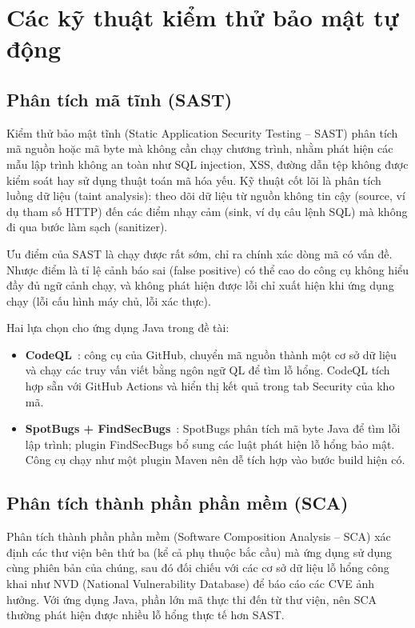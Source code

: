 \documentclass[12pt,a4paper,oneside]{extreport}
\begin{document}
\section{Các kỹ thuật kiểm thử bảo mật tự động}
\label{sec:security-testing}
\subsection{Phân tích mã tĩnh (SAST)}
Kiểm thử bảo mật tĩnh (Static Application Security Testing -- SAST) phân tích mã
nguồn hoặc mã byte mà không cần chạy chương trình, nhằm phát hiện các mẫu lập
trình không an toàn như SQL injection, XSS, đường dẫn tệp không được kiểm soát
hay sử dụng thuật toán mã hóa yếu. Kỹ thuật cốt lõi là phân tích luồng dữ liệu
(taint analysis): theo dõi dữ liệu từ nguồn không tin cậy (source, ví dụ tham số
HTTP) đến các điểm nhạy cảm (sink, ví dụ câu lệnh SQL) mà không đi qua bước làm
sạch (sanitizer).

Ưu điểm của SAST là chạy được rất sớm, chỉ ra chính xác dòng mã có vấn đề. Nhược
điểm là tỉ lệ cảnh báo sai (false positive) có thể cao do công cụ không hiểu đầy
đủ ngữ cảnh chạy, và không phát hiện được lỗi chỉ xuất hiện khi ứng dụng chạy
(lỗi cấu hình máy chủ, lỗi xác thực).

Hai lựa chọn cho ứng dụng Java trong đề tài:
\begin{itemize}
  \item \textbf{CodeQL}~\cite{codeql}: công cụ của GitHub, chuyển mã nguồn thành một
  cơ sở dữ liệu và chạy các truy vấn viết bằng ngôn ngữ QL để tìm lỗ hổng. CodeQL
  tích hợp sẵn với GitHub Actions và hiển thị kết quả trong tab Security của
  kho mã.
  \item \textbf{SpotBugs + FindSecBugs}~\cite{findsecbugs}: SpotBugs phân tích mã byte
  Java để tìm lỗi lập trình; plugin FindSecBugs bổ sung các luật phát hiện lỗ
  hổng bảo mật. Công cụ chạy như một plugin Maven nên dễ tích hợp vào bước build
  hiện có.
\end{itemize}

\subsection{Phân tích thành phần phần mềm (SCA)}
Phân tích thành phần phần mềm (Software Composition Analysis -- SCA) xác định các
thư viện bên thứ ba (kể cả phụ thuộc bắc cầu) mà ứng dụng sử dụng cùng phiên
bản của chúng, sau đó đối chiếu với các cơ sở dữ liệu lỗ hổng công khai như NVD
(National Vulnerability Database) để báo cáo các CVE ảnh hưởng. Với ứng dụng
Java, phần lớn mã thực thi đến từ thư viện, nên SCA thường phát hiện được nhiều
lỗ hổng thực tế hơn SAST.
\end{document}
